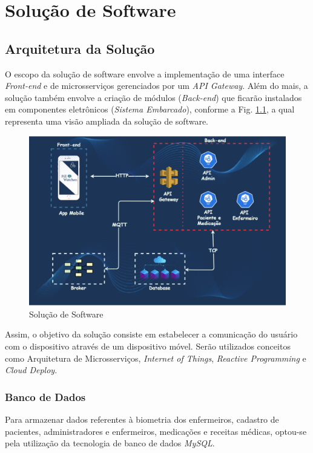 \chapter[Solução de Software]{Solução de Software}
\section{Arquitetura da Solução}

O escopo da solução de software envolve a implementação de uma interface \emph{Front-end} e de microsserviços gerenciados por um \emph{API Gateway}. Além do mais, a solução também envolve a criação de módulos (\textit{Back-end}) que ficarão instalados em componentes eletrônicos (\emph{Sistema Embarcado}), conforme a Fig. \ref{fig:software_solution}, a qual representa uma visão ampliada da solução de software.

\begin{figure}[H]
    \centering
    \includegraphics[width=\textwidth]{figuras/software/solucao_software.png}
    \caption{Solução de Software}
    \label{fig:software_solution}
\end{figure}

Assim, o objetivo da solução consiste em estabelecer a comunicação do usuário com o dispositivo através de um dispositivo móvel. Serão utilizados conceitos como Arquitetura de Microsserviços, \emph{Internet of Things}, \emph{Reactive Programming} e \emph{Cloud Deploy}.

\subsection{Banco de Dados}

Para armazenar dados referentes à biometria dos enfermeiros, cadastro de pacientes, administradores e enfermeiros, medicações e receitas médicas, optou-se pela utilização da tecnologia de banco de dados \emph{MySQL}. 

